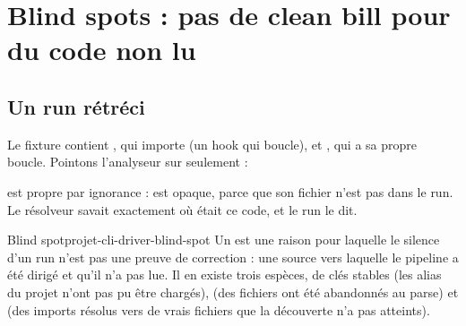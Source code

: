 \section{Blind spots : pas de clean bill pour du code non lu}
\label{sec:projet-cli-driver-blind-spots}

\subsection{Un run rétréci}

Le fixture  contient , qui importe  (un hook qui boucle), et , qui a sa propre boucle. Pointons l'analyseur sur  seulement :


 est \og propre\fg{} par ignorance :  est opaque, parce que son fichier n'est pas dans le run. Le résolveur savait exactement où était ce code, et le run le dit.

\begin{definition}{Blind spot}{projet-cli-driver-blind-spot}
Un  est une raison pour laquelle le silence d'un run n'est pas une preuve de correction : une source vers laquelle le pipeline a été dirigé et qu'il n'a pas lue. Il en existe trois espèces, de clés stables  (les alias du projet n'ont pas pu être chargés),  (des fichiers ont été abandonnés au parse) et  (des imports résolus vers de vrais fichiers que la découverte n'a pas atteints).
\end{definition}

